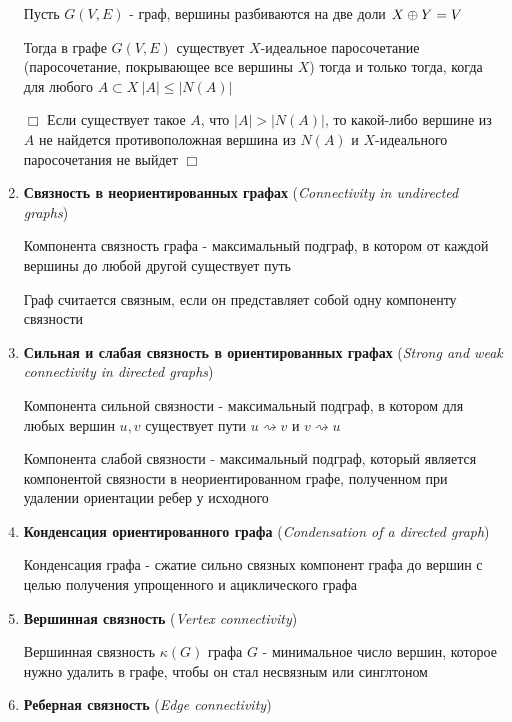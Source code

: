 \documentclass[12pt]{article}
\begin{document}
\begin{enumerate}
        Пусть $G(V, E)$ - граф, вершины разбиваются на две доли $X \oplus Y = V$

        Тогда в графе $G(V, E)$ существует $X$-идеальное паросочетание (паросочетание, покрывающее все вершины $X$) тогда и только тогда,
        когда для любого $A \subset X \ |A| \leq |N(A)|$

        $\Box$ Если существует такое $A$, что $|A| > |N(A)|$, то какой-либо вершине из $A$ не найдется противоположная вершина из $N(A)$ и $X$-идеального паросочетания не выйдет $\Box$


        \item \textbf{Связность в неориентированных графах} (\textit{Connectivity in undirected graphs})

        Компонента связность графа - максимальный подграф, в котором от каждой вершины до любой другой существует путь

        Граф считается связным, если он представляет собой одну компоненту связности

        \item \textbf{Сильная и слабая связность в ориентированных графах} (\textit{Strong and weak connectivity in directed graphs})

        Компонента сильной связности - максимальный подграф, в котором для любых вершин $u, v$ существует пути $u \rightsquigarrow v$ и $v \rightsquigarrow u$

        Компонента слабой связности - максимальный подграф, который является компонентой связности в неориентированном графе, полученном при удалении ориентации ребер у исходного


        \item \textbf{Конденсация ориентированного графа} (\textit{Condensation of a directed graph})

        Конденсация графа - сжатие сильно связных компонент графа до вершин с целью получения упрощенного и ациклического графа

        \item \textbf{Вершинная связность} (\textit{Vertex connectivity})

        Вершинная связность $\kappa(G)$ графа $G$ - минимальное число вершин, которое нужно удалить в графе, чтобы он стал несвязным или синглтоном

        \item \textbf{Реберная связность} (\textit{Edge connectivity})


\end{enumerate}
\end{document}
